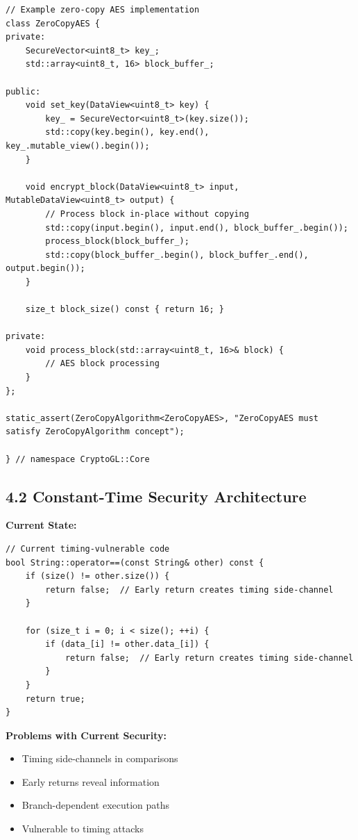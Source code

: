 \documentclass[11pt,a4paper]{article}
\begin{document}
\begin{lstlisting}
// Example zero-copy AES implementation
class ZeroCopyAES {
private:
    SecureVector<uint8_t> key_;
    std::array<uint8_t, 16> block_buffer_;
    
public:
    void set_key(DataView<uint8_t> key) {
        key_ = SecureVector<uint8_t>(key.size());
        std::copy(key.begin(), key.end(), key_.mutable_view().begin());
    }
    
    void encrypt_block(DataView<uint8_t> input, MutableDataView<uint8_t> output) {
        // Process block in-place without copying
        std::copy(input.begin(), input.end(), block_buffer_.begin());
        process_block(block_buffer_);
        std::copy(block_buffer_.begin(), block_buffer_.end(), output.begin());
    }
    
    size_t block_size() const { return 16; }
    
private:
    void process_block(std::array<uint8_t, 16>& block) {
        // AES block processing
    }
};

static_assert(ZeroCopyAlgorithm<ZeroCopyAES>, "ZeroCopyAES must satisfy ZeroCopyAlgorithm concept");

} // namespace CryptoGL::Core
\end{lstlisting}

\subsection{4.2 Constant-Time Security Architecture}

\textbf{Current State:}
\begin{lstlisting}
// Current timing-vulnerable code
bool String::operator==(const String& other) const {
    if (size() != other.size()) {
        return false;  // Early return creates timing side-channel
    }
    
    for (size_t i = 0; i < size(); ++i) {
        if (data_[i] != other.data_[i]) {
            return false;  // Early return creates timing side-channel
        }
    }
    return true;
}
\end{lstlisting}

\textcolor{problemred}{\textbf{Problems with Current Security:}}
\begin{itemize}
    \item Timing side-channels in comparisons
    \item Early returns reveal information
    \item Branch-dependent execution paths
    \item Vulnerable to timing attacks
\end{itemize}
\end{document}
